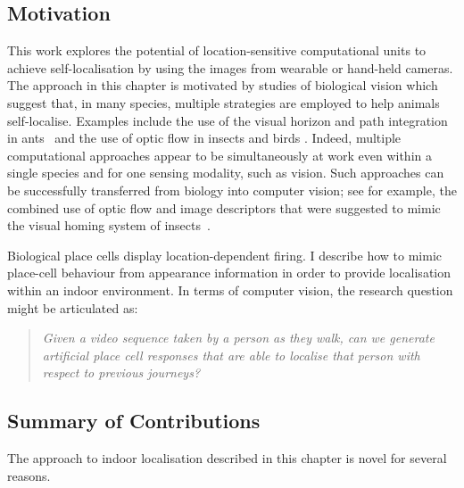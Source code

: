 \subsection{Motivation}

This work explores the potential of location-sensitive computational units to achieve self-localisation by using the images from wearable or hand-held cameras.  The approach in this chapter is motivated by studies of biological vision which suggest that, in many species, multiple strategies are employed to help animals self-localise. Examples include the use of the visual horizon and path integration in ants~\cite{narendra2013mapping} and the use of optic flow in insects and birds \cite{krapp2000neuronal, bhagavatula2011optic}. Indeed, multiple computational approaches appear to be simultaneously at work even within a single species and for one sensing modality, such as vision. Such approaches can be successfully transferred from biology into computer vision; see for example, the combined use of optic flow and image descriptors that were suggested to mimic the visual homing system of insects~\cite{vardy2005biologically}.

Biological place cells display location-dependent firing. I describe how to mimic place-cell behaviour from appearance information in order to provide localisation within an indoor environment. In terms of computer vision, the research question might be articulated as:

\begin{quotation}\textit{Given a video sequence taken by a person as they walk, can we generate artificial place cell responses that are able to localise that person with respect to previous journeys?
}\end{quotation}


\subsection{Summary of Contributions}

The approach to indoor localisation described in this chapter is novel for several reasons. 

